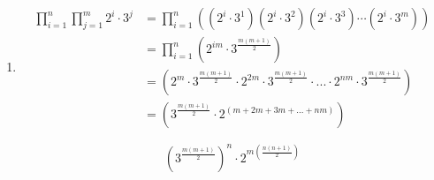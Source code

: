 \begin{enumerate}[label=\arabic*.]
    let 

    \[S = 2^{2(1)} + 2^{2(2)} + 2^{2(3)} + \cdots + 2^{2m}\]

    , and 

    \[
        2^2 S = 2^2 + 2 + 2^{2(2)} + 2 + 2^{2(3)} + 2 + \cdots + 2^{2m} + 2
    \]

    subtract the two

    \[
        2^2 S - S = 2^{2m+2} - 2^{2(1)} \Rightarrow S = \frac{2^{2m+2} - 2^2}{2^2 - 1}
    \]

    then, we continue

    \[
        \sum_{i=1}^n 2^i \left(\frac{2^{2m+2} - 4}{3}\right) = 2^1\left(\frac{2^{2m+2} - 4}{3}\right) + 2^2\left(\frac{2^{2m+2} - 4}{3}\right) + \cdots + 2^n\left(\frac{2^{2m+2} - 4}{3}\right)
    \]

    \[
        = \left(\frac{2^{2m+2} - 4}{3}\right)\left(2^1 + 2^2 + \cdots + 2^n\right)
    \]

    let $S' = 2^1 + 2^2 + 2^3 + \cdots + 2^n$, and $2S' = 2^2 + 2^3 + 2^4 + \cdots + 2^{n+1}$, we find 

    \[
        2S' - S' = 2^{n+1} - 2^1 \Rightarrow S' = 2^{n+1} - 2
    \]

    and therefore

    \[
        \boxed{\left(\frac{2^{2m+2} - 4}{3}\right)(2^{n+1} - 2)}
    \]

    \medskip
    \begin{center}
    \rule{0.3\linewidth}{0.2pt}
    \end{center}
    \medskip

    \item 

    \begin{align*}
        \prod_{i=1}^n \prod_{j=1}^m 2^i \cdot 3^j &= \prod_{i=1}^n \left((2^i \cdot 3^1)(2^i \cdot 3^2)(2^i \cdot 3^3) \cdots (2^i \cdot 3^m)\right) \\
        &= \prod_{i=1}^n \left(2^{im} \cdot 3^{\frac{m(m+1)}{2}}\right) \\
        &= \left(2^m \cdot 3^{\frac{m(m+1)}{2}} \cdot 2^{2m} \cdot 3^{\frac{m(m+1)}{2}} \cdot ... \cdot 2^{nm} \cdot 3^{\frac{m(m+1)}{2}}\right) \\
        &= \left(3^{\frac{m(m+1)}{2}} \cdot 2^{(m + 2m + 3m + ... + nm)}\right)
    \end{align*}

    \[
        \boxed{\left(3^{\frac{m(m+1)}{2}}\right)^n \cdot 2^{m\left(\frac{n(n+1)}{2}\right)}}
    \]
\end{enumerate}

